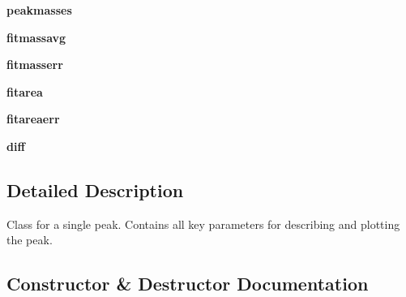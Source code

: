 \begin{DoxyCompactItemize}
\item 
\hypertarget{class_uni_dec_1_1unidec__modules_1_1peakstructure_1_1_peak_a923e0e5dc8eda168ce4858e5f8ae6e8b}{}{\bfseries peakmasses}\label{class_uni_dec_1_1unidec__modules_1_1peakstructure_1_1_peak_a923e0e5dc8eda168ce4858e5f8ae6e8b}

\item 
\hypertarget{class_uni_dec_1_1unidec__modules_1_1peakstructure_1_1_peak_a8c3e68f71153e268cd62c514c24b3edc}{}{\bfseries fitmassavg}\label{class_uni_dec_1_1unidec__modules_1_1peakstructure_1_1_peak_a8c3e68f71153e268cd62c514c24b3edc}

\item 
\hypertarget{class_uni_dec_1_1unidec__modules_1_1peakstructure_1_1_peak_a4f0946d4b17431494fdc5374ab4e52d5}{}{\bfseries fitmasserr}\label{class_uni_dec_1_1unidec__modules_1_1peakstructure_1_1_peak_a4f0946d4b17431494fdc5374ab4e52d5}

\item 
\hypertarget{class_uni_dec_1_1unidec__modules_1_1peakstructure_1_1_peak_a314dcb5673e2c9daf3573336269804b1}{}{\bfseries fitarea}\label{class_uni_dec_1_1unidec__modules_1_1peakstructure_1_1_peak_a314dcb5673e2c9daf3573336269804b1}

\item 
\hypertarget{class_uni_dec_1_1unidec__modules_1_1peakstructure_1_1_peak_a7e58627c482226cf3c31232db130f934}{}{\bfseries fitareaerr}\label{class_uni_dec_1_1unidec__modules_1_1peakstructure_1_1_peak_a7e58627c482226cf3c31232db130f934}

\item 
\hypertarget{class_uni_dec_1_1unidec__modules_1_1peakstructure_1_1_peak_a60f58325ad26b23c400b09da8da0ed19}{}{\bfseries diff}\label{class_uni_dec_1_1unidec__modules_1_1peakstructure_1_1_peak_a60f58325ad26b23c400b09da8da0ed19}

\end{DoxyCompactItemize}


\subsection{Detailed Description}
\begin{DoxyVerb}Class for a single peak. Contains all key parameters for describing and plotting the peak.
\end{DoxyVerb}
 

\subsection{Constructor \& Destructor Documentation}
\hypertarget{class_uni_dec_1_1unidec__modules_1_1peakstructure_1_1_peak_afe277eae2bb89f885913e329fb566983}{}
